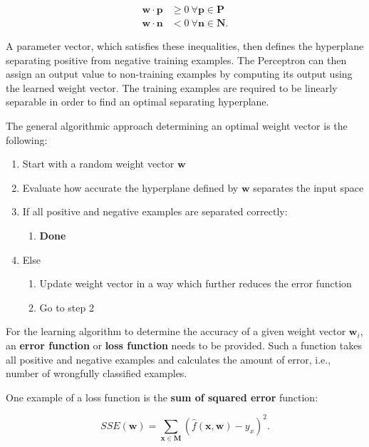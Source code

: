 \begin{equation}
    \begin{split}
        \bm{w} \cdot \bm{p} &\geq 0 ~ \forall \bm{p} \in \bm{P} \\
        \bm{w} \cdot \bm{n} &< 0 ~ \forall \bm{n} \in \bm{N}.
    \end{split}
\end{equation}

A parameter vector, which satisfies these inequalities, then defines the hyperplane separating positive from negative training examples.
The Perceptron can then assign an output value to non-training examples by computing its output using the learned weight vector.
The training examples are required to be linearly separable in order to find an optimal separating hyperplane.

The general algorithmic approach determining an optimal weight vector is the following:

\begin{enumerate}
    \item Start with a random weight vector $\bm{w}$
    \item Evaluate how accurate the hyperplane defined by $\bm{w}$ separates the input space
    \item If all positive and negative examples are separated correctly:
    \begin{enumerate}
        \item \textbf{Done}
    \end{enumerate}
    \item Else
    \begin{enumerate}
        \item Update weight vector in a way which further reduces the error function
        \item Go to step 2
    \end{enumerate}
\end{enumerate}

For the learning algorithm to determine the accuracy of a given weight vector $\bm{w}_i$, an \textbf{error function} or \textbf{loss function} needs to be provided.
Such a function takes all positive and negative examples and calculates the amount of error, i.e., number of wrongfully classified examples.

One example of a loss function is the \textbf{sum of squared error} function:

\begin{equation}
    \label{eq:sse-loss}
    SSE(\bm{w}) = \sum_{\bm{x} \in \bm{M}} (\hat{f}(\bm{x}, \bm{w}) - y_x)^2.
\end{equation}

